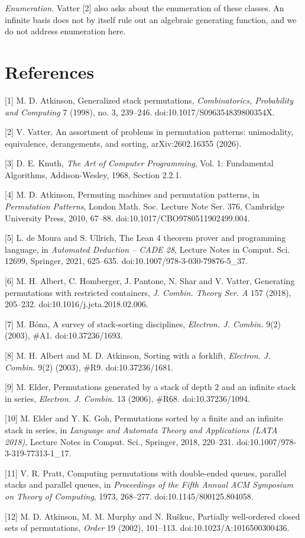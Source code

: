 \documentclass[11pt,letterpaper]{article}
\begin{document}
\emph{Enumeration.} Vatter {[}2{]} also asks about the enumeration of
these classes. An infinite basis does not by itself rule out an
algebraic generating function, and we do not address enumeration here.

\clearpage
\begingroup\small
\section{References}\label{references}

{[}1{]} M. D. Atkinson, Generalized stack permutations,
\emph{Combinatorics, Probability and Computing} 7 (1998), no. 3,
239--246. doi:10.1017/S096354839800354X.

{[}2{]} V. Vatter, An assortment of problems in permutation patterns:
unimodality, equivalence, derangements, and sorting, arXiv:2602.16355
(2026).

{[}3{]} D. E. Knuth, \emph{The Art of Computer Programming}, Vol. 1:
Fundamental Algorithms, Addison-Wesley, 1968, Section 2.2.1.

{[}4{]} M. D. Atkinson, Permuting machines and permutation patterns, in
\emph{Permutation Patterns}, London Math. Soc. Lecture Note Ser. 376,
Cambridge University Press, 2010, 67--88.
doi:10.1017/CBO9780511902499.004.

{[}5{]} L. de Moura and S. Ullrich, The Lean 4 theorem prover and
programming language, in \emph{Automated Deduction -- CADE 28}, Lecture
Notes in Comput. Sci. 12699, Springer, 2021, 625--635.
doi:10.1007/978-3-030-79876-5\_37.

{[}6{]} M. H. Albert, C. Homberger, J. Pantone, N. Shar and V. Vatter,
Generating permutations with restricted containers, \emph{J. Combin.
Theory Ser. A} 157 (2018), 205--232. doi:10.1016/j.jcta.2018.02.006.

{[}7{]} M. Bóna, A survey of stack-sorting disciplines, \emph{Electron.
J. Combin.} 9(2) (2003), \#A1. doi:10.37236/1693.

{[}8{]} M. H. Albert and M. D. Atkinson, Sorting with a forklift,
\emph{Electron. J. Combin.} 9(2) (2003), \#R9. doi:10.37236/1681.

{[}9{]} M. Elder, Permutations generated by a stack of depth 2 and an
infinite stack in series, \emph{Electron. J. Combin.} 13 (2006), \#R68.
doi:10.37236/1094.

{[}10{]} M. Elder and Y. K. Goh, Permutations sorted by a finite and an
infinite stack in series, in \emph{Language and Automata Theory and
Applications (LATA 2018)}, Lecture Notes in Comput. Sci., Springer,
2018, 220--231. doi:10.1007/978-3-319-77313-1\_17.

{[}11{]} V. R. Pratt, Computing permutations with double-ended queues,
parallel stacks and parallel queues, in \emph{Proceedings of the Fifth
Annual ACM Symposium on Theory of Computing}, 1973, 268--277.
doi:10.1145/800125.804058.

{[}12{]} M. D. Atkinson, M. M. Murphy and N. Ruškuc, Partially
well-ordered closed sets of permutations, \emph{Order} 19 (2002),
101--113. doi:10.1023/A:1016500300436.

\endgroup
\end{document}
